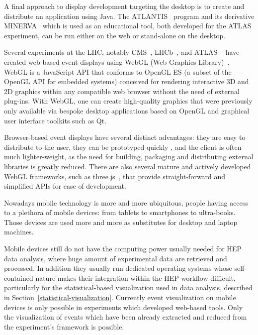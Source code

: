 \documentclass[12pt,a4paper]{article}
\begin{document}
A final approach to display development targeting the desktop is to create and distribute an application using Java. The ATLANTIS~\cite{ATLASAtlantis}
program and its derivative MINERVA~\cite{ATLASMinerva} which is used as an educational tool, both developed for the ATLAS experiment,
can be run either on the web or stand-alone on the desktop.


Several experiments at the LHC, notably CMS~\cite{CMSISpyWebGL}, LHCb~\cite{LHCbOnline2014}, and ATLAS
~\cite{ATLASTada2016, ATLASTracer2015} have created web-based event displays using WebGL (Web Graphics Library)~\cite{WebGL2011}.
WebGL is a JavaScript API that conforms to OpenGL ES (a subset of the OpenGL API for embedded systems) conceived for
rendering interactive 3D and 2D graphics within any compatible web browser without the need of external plug-ins. With WebGL,
one can create high-quality graphics that were previously only available via bespoke desktop applications based on OpenGL and
graphical user interface toolkits such as Qt.

Browser-based event displays have several distinct advantages: they are easy to distribute to the user, they can be prototyped quickly
, and the client is often much lighter-weight, as the need for building, packaging and distributing external libraries is greatly reduced.
There are also several mature and actively developed WebGL frameworks, such as three.js~\cite{ThreeJSXXXX}, that provide straight-forward
and simplified APIs for ease of development.


Nowadays mobile technology is more and more ubiquitous, people having access to a plethora of mobile devices: from tablets to
smartphones to ultra-books. Those devices are used more and more as substitutes for desktop and laptop machines.

Mobile devices still do not have the computing power usually needed for HEP data analysis, where huge amount of experimental data
are retrieved and processed. In addition they usually run dedicated operating systems whose self-contained nature
makes their integration within the HEP workflow difficult, particularly for the statistical-based visualization used in
data analysis, described in Section~\ref{statistical-visualization}. Currently event visualization on mobile devices is only
possible in experiments which developed web-based tools. Only the visualization of events which have been already
extracted and reduced from the experiment's framework is possible.
\end{document}
